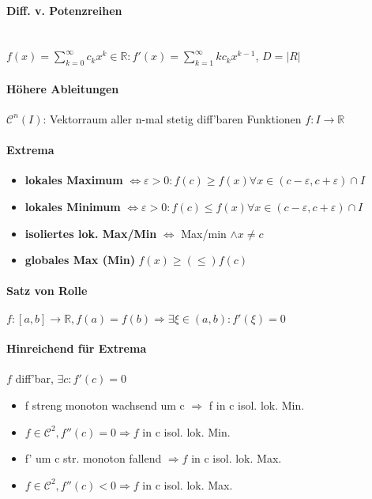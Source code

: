 \documentclass[paper=a3,paper=landscape, fontsize=9pt,DIV=30]{scrartcl}
\newcommand{\real}{{\mathbb{R}}}
\begin{document}
\begin{multicols*}{4}
  \paragraph{Diff. v. Potenzreihen}\hspace{0pt}\\
  $ f(x)=\sum_{k=0}^{\infty}c_kx^k \in \real: f'(x)=\sum_{k=1}^{\infty}kc_kx^{k-1}$, $D = \lvert R \rvert$


  \paragraph{Höhere Ableitungen}
  $\mathscr{C}^n(I)$: Vektorraum aller n-mal stetig diff'baren Funktionen $f: I \rightarrow \real$


  \paragraph{Extrema}
  \begin{itemize}
  \item \textbf{lokales Maximum} $\Leftrightarrow \varepsilon > 0: f(c) \geq f(x) \forall x \in (c-\varepsilon,c+\varepsilon)\cap I$
  \item \textbf{lokales Minimum} $\Leftrightarrow \varepsilon > 0: f(c) \leq f(x) \forall x \in (c-\varepsilon,c+\varepsilon)\cap I$
  \item \textbf{isoliertes lok. Max/Min} $\Leftrightarrow$ Max/min $\wedge x \neq c$
  \item \textbf{globales Max (Min)} $f(x) \geq (\leq) f(c)$
  \end{itemize}


  \paragraph{Satz von Rolle}
  $f: [a,b] \rightarrow \real, f(a)=f(b) \Rightarrow \exists \xi \in (a,b): f'(\xi)=0$


  \paragraph{Hinreichend für Extrema}
  $f$ diff'bar, $\exists c: f'(c)=0$
  \begin{itemize}
  \item f streng monoton wachsend um c $\Rightarrow$ f in c isol. lok. Min.
  \item $f \in \mathscr{C}^2, f''(c)=0 \Rightarrow f$ in c isol. lok. Min.
  \item f' um c str. monoton fallend $\Rightarrow f$ in c isol. lok. Max.
  \item $f \in \mathscr{C}^2, f''(c)<0 \Rightarrow f$ in c isol. lok. Max.
  \end{itemize}



\end{multicols*}
\end{document}
